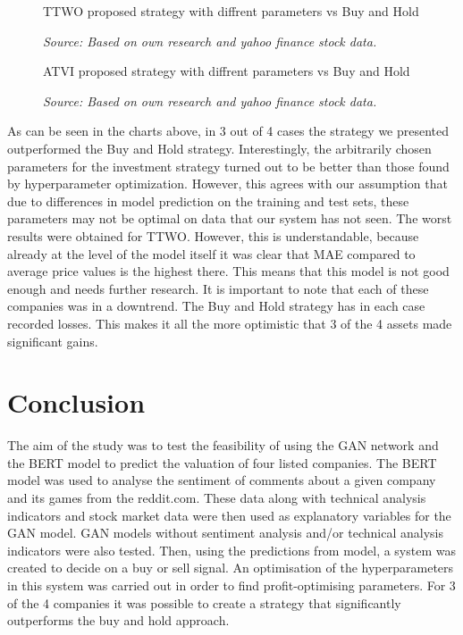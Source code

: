 \documentclass[11pt]{article} %
\begin{document}
\begin{figure}[H]
\caption{TTWO proposed strategy with diffrent parameters vs Buy and Hold}
\begin{adjustbox}{width=1.3\textwidth,center}

\end{adjustbox}
\caption*{\textit{Source: Based on own research and yahoo finance stock data.}}
\end{figure}

\begin{figure}[H]
\caption{ATVI proposed strategy with diffrent parameters vs Buy and Hold}
\begin{adjustbox}{width=1.3\textwidth,center}

\end{adjustbox}
\caption*{\textit{Source: Based on own research and yahoo finance stock data.}}
\end{figure}


 As can be seen in the charts above, in 3 out of 4 cases the strategy we presented outperformed the Buy and Hold strategy. Interestingly, the arbitrarily chosen parameters for the investment strategy turned out to be better than those found by hyperparameter optimization. However, this agrees with our assumption that due to differences in model prediction on the training and test sets, these parameters may not be optimal on data that our system has not seen. The worst results were obtained for TTWO. However, this is understandable, because already at the level of the model itself it was clear that MAE compared to average price values is the highest there. This means that this model is not good enough and needs further research. It is important to note that each of these companies was in a downtrend. The Buy and Hold strategy has in each case recorded losses. This makes it all the more optimistic that 3 of the 4 assets made significant gains. 

\section{Conclusion}

The aim of the study was to test the feasibility of using the GAN network and the BERT model to predict the valuation of four listed companies. The BERT model was used to analyse the sentiment of comments about a given company and its games from the reddit.com. These data along with technical analysis indicators and stock market data were then used as explanatory variables for the GAN model. GAN models without sentiment analysis and/or technical analysis indicators were also tested. Then, using the predictions from model, a system was created to decide on a buy or sell signal. An optimisation of the hyperparameters in this system was carried out in order to find profit-optimising parameters. For 3 of the 4 companies it was possible to create a strategy that significantly outperforms the buy and hold approach. \\
\end{document}
